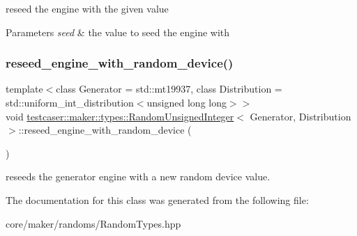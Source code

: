 reseed the engine with the given value 


\begin{DoxyParams}{Parameters}
{\em seed} & the value to seed the engine with \\
\hline
\end{DoxyParams}
\mbox{\label{classtestcaser_1_1maker_1_1types_1_1RandomUnsignedInteger_acd7ff23154cf792b11d8344d091100fe}} 
\subsubsection{\texorpdfstring{reseed\_engine\_with\_random\_device()}{reseed\_engine\_with\_random\_device()}}
{\footnotesize\ttfamily template$<$class Generator = std\+::mt19937, class Distribution = std\+::uniform\+\_\+int\+\_\+distribution$<$unsigned long long$>$$>$ \\
void \mbox{\hyperlink{classtestcaser_1_1maker_1_1types_1_1RandomUnsignedInteger}{testcaser\+::maker\+::types\+::\+Random\+Unsigned\+Integer}}$<$ Generator, Distribution $>$\+::reseed\+\_\+engine\+\_\+with\+\_\+random\+\_\+device (\begin{DoxyParamCaption}{ }\end{DoxyParamCaption})\hspace{0.3cm}{\ttfamily [inline]}}



reseeds the generator engine with a new random device value. 



The documentation for this class was generated from the following file\+:\begin{DoxyCompactItemize}
\item 
core/maker/randoms/Random\+Types.\+hpp\end{DoxyCompactItemize}
